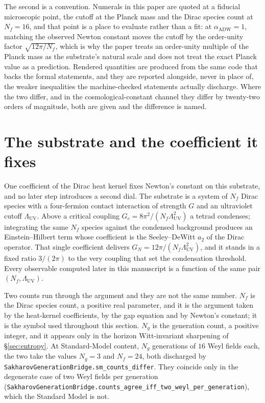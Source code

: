 \documentclass[aps,prd,nofootinbib,superscriptaddress,12pt]{revtex4-2}
\DeclareRobustCommand{\lb}{\discretionary{}{}{}}
\begin{document}
The second is a convention. Numerals in this paper are quoted at a fiducial
microscopic point, the cutoff at the Planck mass and the Dirac species count at
$N_f = 16$, and that point is a place to evaluate rather than a fit: at
$\alpha_{\mathrm{ADW}} = 1$, matching the observed Newton constant moves the
cutoff by the order-unity factor $\sqrt{12\pi/N_f}$, which is why the paper
treats an order-unity multiple of the Planck mass as the substrate's natural
scale and does not treat the exact Planck value as a prediction. Rendered
quantities are produced from the same code that backs the formal statements, and
they are reported alongside, never in place of, the weaker inequalities the
machine-checked statements actually discharge. Where the two differ, and in the
cosmological-constant channel they differ by twenty-two orders of magnitude,
both are given and the difference is named.

\section{The substrate and the coefficient it fixes}
\label{sec:substrate}

One coefficient of the Dirac heat kernel fixes Newton's constant on this
substrate, and no later step introduces a second dial. The substrate is a
system of $N_f$ Dirac species with a four-fermion contact interaction of
strength $G$ and an ultraviolet cutoff $\Lambda_{\mathrm{UV}}$. Above a
critical coupling $G_c = 8\pi^{2}/(N_f\Lambda_{\mathrm{UV}}^{2})$ a tetrad
condenses; integrating the same $N_f$ species against the condensed
background produces an Einstein--Hilbert term whose coefficient is the
Seeley--DeWitt $a_2$ of the Dirac operator. That single coefficient
delivers $G_N = 12\pi/(N_f\Lambda_{\mathrm{UV}}^{2})$, and it stands in a
fixed ratio $3/(2\pi)$ to the very coupling that set the condensation
threshold. Every observable computed later in this manuscript is a
function of the same pair $(N_f,\Lambda_{\mathrm{UV}})$.

Two counts run through the argument and they are not the same number.
$N_f$ is the Dirac species count, a positive real parameter, and it is the
argument taken by the heat-kernel coefficients, by the gap equation and by
Newton's constant; it is the symbol used throughout this section. $N_g$ is
the generation count, a positive integer, and it appears only in the
horizon Witt-invariant sharpening of \S\ref{sec:entropy}. At
Standard-Model content, $N_g$ generations of $16$ Weyl fields each, the two
take the values $N_g = 3$ and $N_f = 24$, both discharged by
\texttt{Sakharov\lb{}Generation\lb{}Bridge.\lb{}sm\_\lb{}counts\_\lb{}differ}. They coincide only in
the degenerate case of two Weyl fields per generation
(\texttt{Sakharov\lb{}Generation\lb{}Bridge.\lb{}counts\_\lb{}agree\_\lb{}iff\_\lb{}two\_\lb{}weyl\_\lb{}per\_\lb{}generation}),
which the Standard Model is not.
\end{document}
